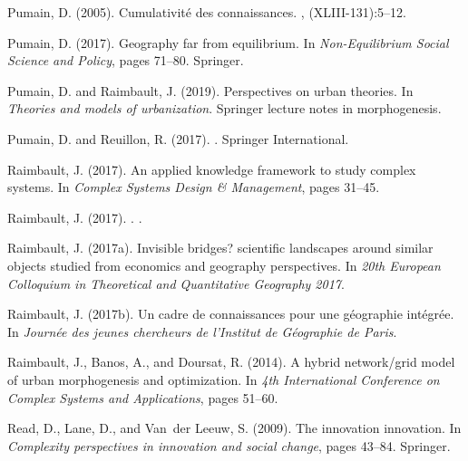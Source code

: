 \begin{thebibliography}{}
Pumain, D. (2005).
\newblock Cumulativit{\'e} des connaissances.
, (XLIII-131):5--12.

Pumain, D. (2017).
\newblock Geography far from equilibrium.
\newblock In {\em Non-Equilibrium Social Science and Policy}, pages 71--80.
  Springer.

Pumain, D. and Raimbault, J. (2019).
\newblock Perspectives on urban theories.
\newblock In {\em Theories and models of urbanization}. Springer lecture notes
  in morphogenesis.

Pumain, D. and Reuillon, R. (2017).
.
\newblock Springer International.

Raimbault, J. (2017).
\newblock An applied knowledge framework to study complex systems.
\newblock In {\em Complex Systems Design \& Management}, pages 31--45.

{Raimbault}, J. (2017).
.
.

Raimbault, J. (2017a).
\newblock Invisible bridges? scientific landscapes around similar objects
  studied from economics and geography perspectives.
\newblock In {\em 20th European Colloquium in Theoretical and Quantitative
  Geography 2017}.

Raimbault, J. (2017b).
\newblock Un cadre de connaissances pour une g{\'e}ographie int{\'e}gr{\'e}e.
\newblock In {\em Journ{\'e}e des jeunes chercheurs de l'Institut de
  G{\'e}ographie de Paris}.

Raimbault, J., Banos, A., and Doursat, R. (2014).
\newblock A hybrid network/grid model of urban morphogenesis and optimization.
\newblock In {\em 4th International Conference on Complex Systems and
  Applications}, pages 51--60.

Read, D., Lane, D., and Van~der Leeuw, S. (2009).
\newblock The innovation innovation.
\newblock In {\em Complexity perspectives in innovation and social change},
  pages 43--84. Springer.


\end{thebibliography}

